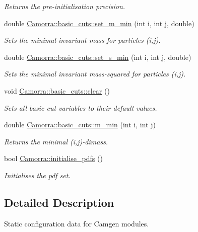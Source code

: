 \begin{DoxyCompactItemize}
\begin{DoxyCompactList}\small\item\em Returns the pre-\/initialisation precision. \end{DoxyCompactList}\item 
double \hyperlink{a00801_a64e8d156b26722a73eb4bcc7b805b469}{Camorra::basic\_\-cuts::set\_\-m\_\-min} (int i, int j, double)
\begin{DoxyCompactList}\small\item\em Sets the minimal invariant mass for particles (i,j). \end{DoxyCompactList}\item 
double \hyperlink{a00801_a7345eaf023667a334f5be702df0ff369}{Camorra::basic\_\-cuts::set\_\-s\_\-min} (int i, int j, double)
\begin{DoxyCompactList}\small\item\em Sets the minimal invariant mass-\/squared for particles (i,j). \end{DoxyCompactList}\item 
\hypertarget{a00801_ab46d99e27f4cbe70c6ff3c21511d6d67}{
void \hyperlink{a00801_ab46d99e27f4cbe70c6ff3c21511d6d67}{Camorra::basic\_\-cuts::clear} ()}
\label{a00801_ab46d99e27f4cbe70c6ff3c21511d6d67}

\begin{DoxyCompactList}\small\item\em Sets all basic cut variables to their default values. \end{DoxyCompactList}\item 
\hypertarget{a00801_ad683c0d55b937953163afccc3870210a}{
double \hyperlink{a00801_ad683c0d55b937953163afccc3870210a}{Camorra::basic\_\-cuts::m\_\-min} (int i, int j)}
\label{a00801_ad683c0d55b937953163afccc3870210a}

\begin{DoxyCompactList}\small\item\em Returns the minimal (i,j)-\/dimass. \end{DoxyCompactList}\item 
bool \hyperlink{a00800_a10faaa355725620453fd5aa6cf7e2832}{Camorra::initialise\_\-pdfs} ()
\begin{DoxyCompactList}\small\item\em Initialises the pdf set. \end{DoxyCompactList}\end{DoxyCompactItemize}


\subsection{Detailed Description}
Static configuration data for Camgen modules. 